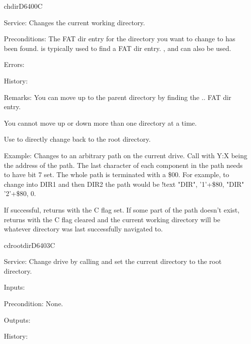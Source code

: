 \begin{hyppotrap}{chdir}{D640}{0C}
\item [Service:]
  Changes the current working directory.
\item [Preconditions:]
  The FAT dir entry for the directory you want to change to has been
  found.  is typically used to find a FAT dir entry.
  ,  and  can also be
  used.
\item [Errors:]
\item [History:]
\item [Remarks:]
  You can move up to the parent directory by finding the .. FAT dir entry.

  You cannot move up or down more than one directory at a time.

  Use  to directly change back to the root directory.
\item [Example:]
  Changes to an arbitrary path on the current drive. Call with Y:X being the
  address of the path. The last character of each component in the path needs
  to have bit 7 set. The whole path is terminated with a \$00. For example,
  to change into DIR1 and then DIR2 the path would be
  {\codefont !text "DIR", '1'+\$80, "DIR" '2'+\$80, 0}.

  If successful, returns with the C flag set. If some part of the path doesn't
  exist, returns with the C flag cleared and the current working directory will
  be whatever directory was last successfully navigated to.
\end{hyppotrap}

\newpage
\begin{hyppotrap}{cdrootdir}{D640}{3C}
\item [Service:]
  Change drive by calling  and set the current directory
  to the root directory.
\item [Inputs:]
\item [Precondition:]
  None.
\item [Outputs:]
\item [History:]
\end{hyppotrap}

